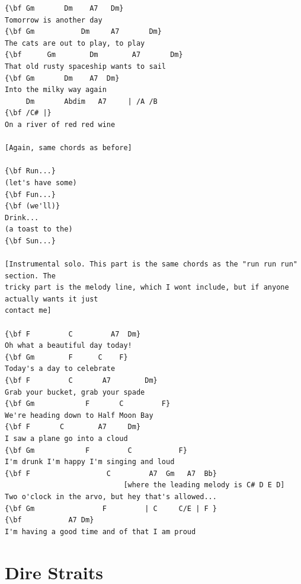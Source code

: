 \documentclass[a4paper]{article}
\begin{document}
\begin{Verbatim}[commandchars=\\\{\}]
{\bf Gm       Dm    A7   Dm}
Tomorrow is another day
{\bf Gm           Dm     A7       Dm}
The cats are out to play, to play
{\bf      Gm        Dm        A7       Dm}
That old rusty spaceship wants to sail
{\bf Gm       Dm    A7  Dm}
Into the milky way again
     Dm       Abdim   A7     | /A /B 
{\bf /C# |}
On a river of red red wine

[Again, same chords as before]

{\bf Run...}
(let's have some)
{\bf Fun...}
{\bf (we'll)}
Drink...
(a toast to the)
{\bf Sun...}

[Instrumental solo. This part is the same chords as the "run run run" section. The 
tricky part is the melody line, which I wont include, but if anyone actually wants it just 
contact me]

{\bf F         C         A7  Dm}
Oh what a beautiful day today!
{\bf Gm        F      C    F}
Today's a day to celebrate
{\bf F         C       A7        Dm}
Grab your bucket, grab your spade
{\bf Gm            F       C         F}
We're heading down to Half Moon Bay
{\bf F       C        A7     Dm}
I saw a plane go into a cloud
{\bf Gm            F         C           F}
I'm drunk I'm happy I'm singing and loud
{\bf F                  C         A7  Gm   A7  Bb}
                            [where the leading melody is C# D E D]
Two o'clock in the arvo, but hey that's allowed...
{\bf Gm                F         | C     C/E | F }
{\bf           A7 Dm}
I'm having a good time and of that I am proud
\end{Verbatim}
\newpage
\section{Dire Straits} %
\label{sec:Dire Straits}
\end{document}
